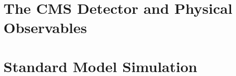 \chapter{The CMS Detector and Physical Observables}
\lipsum
\chapter{Standard Model Simulation}
\lipsum
